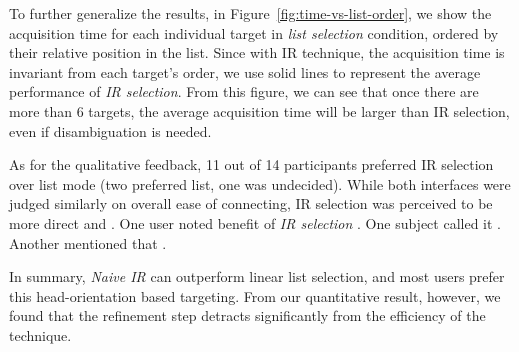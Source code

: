To further generalize the results, in Figure~\ref{fig:time-vs-list-order}, we show the acquisition time for each individual target in {\em list selection} condition, ordered by their relative position in the list. Since with IR technique, the acquisition time is invariant from each target's order, we use solid lines to represent the average performance of {\em IR selection}. From this figure, we can see that once there are more than 6 targets, the average acquisition time will be larger than IR selection, even if disambiguation is needed. %

As for the qualitative feedback, 11 out of 14 participants preferred IR selection over list mode (two preferred list, one was undecided). While both interfaces were judged similarly on overall ease of connecting, IR selection was perceived to be more direct and . One user noted benefit of {\em IR selection}  .  One subject called it . Another mentioned that .

In summary, {\em Naive IR} can outperform linear list selection, and most users prefer this head-orientation based targeting. From our quantitative result, however, we found that the refinement step detracts significantly from the efficiency of the technique.






